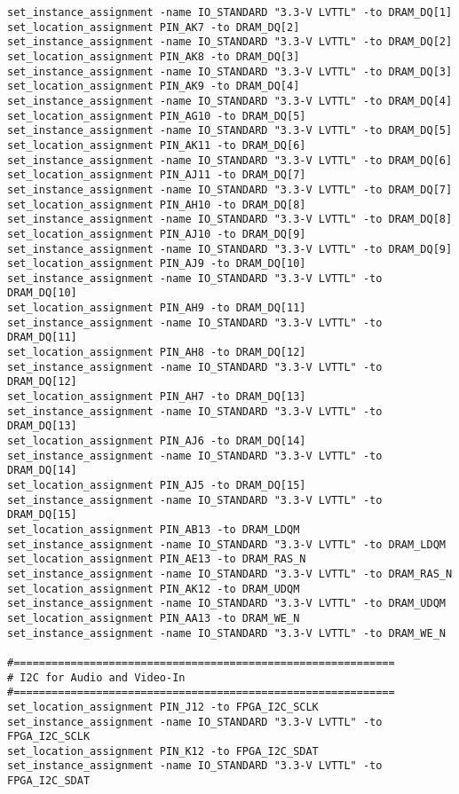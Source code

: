 \begin{verbatim}
set_instance_assignment -name IO_STANDARD "3.3-V LVTTL" -to DRAM_DQ[1]
set_location_assignment PIN_AK7 -to DRAM_DQ[2]
set_instance_assignment -name IO_STANDARD "3.3-V LVTTL" -to DRAM_DQ[2]
set_location_assignment PIN_AK8 -to DRAM_DQ[3]
set_instance_assignment -name IO_STANDARD "3.3-V LVTTL" -to DRAM_DQ[3]
set_location_assignment PIN_AK9 -to DRAM_DQ[4]
set_instance_assignment -name IO_STANDARD "3.3-V LVTTL" -to DRAM_DQ[4]
set_location_assignment PIN_AG10 -to DRAM_DQ[5]
set_instance_assignment -name IO_STANDARD "3.3-V LVTTL" -to DRAM_DQ[5]
set_location_assignment PIN_AK11 -to DRAM_DQ[6]
set_instance_assignment -name IO_STANDARD "3.3-V LVTTL" -to DRAM_DQ[6]
set_location_assignment PIN_AJ11 -to DRAM_DQ[7]
set_instance_assignment -name IO_STANDARD "3.3-V LVTTL" -to DRAM_DQ[7]
set_location_assignment PIN_AH10 -to DRAM_DQ[8]
set_instance_assignment -name IO_STANDARD "3.3-V LVTTL" -to DRAM_DQ[8]
set_location_assignment PIN_AJ10 -to DRAM_DQ[9]
set_instance_assignment -name IO_STANDARD "3.3-V LVTTL" -to DRAM_DQ[9]
set_location_assignment PIN_AJ9 -to DRAM_DQ[10]
set_instance_assignment -name IO_STANDARD "3.3-V LVTTL" -to DRAM_DQ[10]
set_location_assignment PIN_AH9 -to DRAM_DQ[11]
set_instance_assignment -name IO_STANDARD "3.3-V LVTTL" -to DRAM_DQ[11]
set_location_assignment PIN_AH8 -to DRAM_DQ[12]
set_instance_assignment -name IO_STANDARD "3.3-V LVTTL" -to DRAM_DQ[12]
set_location_assignment PIN_AH7 -to DRAM_DQ[13]
set_instance_assignment -name IO_STANDARD "3.3-V LVTTL" -to DRAM_DQ[13]
set_location_assignment PIN_AJ6 -to DRAM_DQ[14]
set_instance_assignment -name IO_STANDARD "3.3-V LVTTL" -to DRAM_DQ[14]
set_location_assignment PIN_AJ5 -to DRAM_DQ[15]
set_instance_assignment -name IO_STANDARD "3.3-V LVTTL" -to DRAM_DQ[15]
set_location_assignment PIN_AB13 -to DRAM_LDQM
set_instance_assignment -name IO_STANDARD "3.3-V LVTTL" -to DRAM_LDQM
set_location_assignment PIN_AE13 -to DRAM_RAS_N
set_instance_assignment -name IO_STANDARD "3.3-V LVTTL" -to DRAM_RAS_N
set_location_assignment PIN_AK12 -to DRAM_UDQM
set_instance_assignment -name IO_STANDARD "3.3-V LVTTL" -to DRAM_UDQM
set_location_assignment PIN_AA13 -to DRAM_WE_N
set_instance_assignment -name IO_STANDARD "3.3-V LVTTL" -to DRAM_WE_N

#============================================================
# I2C for Audio and Video-In
#============================================================
set_location_assignment PIN_J12 -to FPGA_I2C_SCLK
set_instance_assignment -name IO_STANDARD "3.3-V LVTTL" -to FPGA_I2C_SCLK
set_location_assignment PIN_K12 -to FPGA_I2C_SDAT
set_instance_assignment -name IO_STANDARD "3.3-V LVTTL" -to FPGA_I2C_SDAT


\end{verbatim}
